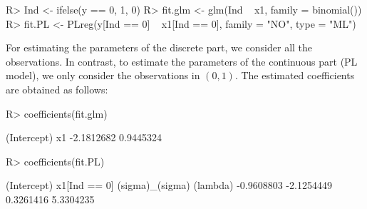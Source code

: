 \begin{Schunk}
\begin{Sinput}
R> Ind <- ifelse(y == 0, 1, 0)
R> fit.glm <- glm(Ind ~ x1, family = binomial())
R> fit.PL <- PLreg(y[Ind == 0] ~ x1[Ind == 0], family = "NO", type = "ML")
\end{Sinput}
\end{Schunk}
For estimating the parameters of the discrete part, we consider all the observations. In contrast, to estimate the parameters of the continuous part (PL model), we only consider the observations in $(0,1)$. The estimated coefficients are obtained as follows:
\begin{Schunk}
\begin{Sinput}
R> coefficients(fit.glm)
\end{Sinput}
\begin{Soutput}
(Intercept)          x1 
 -2.1812682   0.9445324 
\end{Soutput}
\begin{Sinput}
R> coefficients(fit.PL)
\end{Sinput}
\begin{Soutput}
    (Intercept)    x1[Ind == 0] (sigma)_(sigma)        (lambda) 
     -0.9608803      -2.1254449       0.3261416       5.3304235
\end{Soutput}
\end{Schunk}

